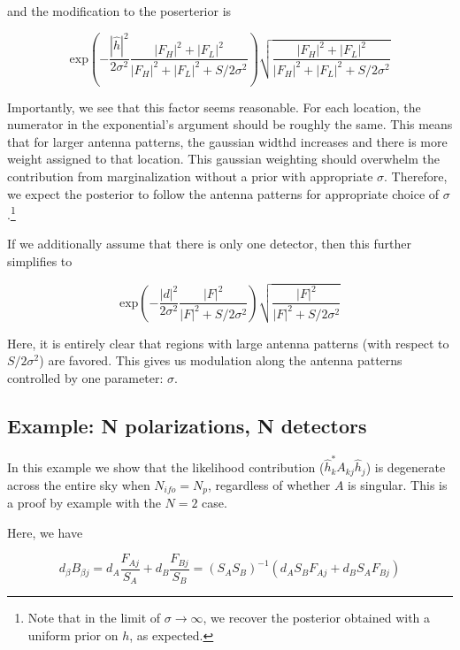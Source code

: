 \documentclass[10pt]{article}
\begin{document}
and the modification to the poserterior is

\begin{equation}
\mathrm{exp}\left( -\frac{|\hat{h}|^2}{2\sigma^2}\frac{|F_H|^2+|F_L|^2}{|F_H|^2+|F_L|^2+S/2\sigma^2}\right) \sqrt{\frac{|F_H|^2+|F_L|^2}{|F_H|^2+|F_L|^2 + S/2\sigma^2}}
\end{equation}

Importantly, we see that this factor seems reasonable. For each location, the numerator in the exponential's argument should be roughly the same. This means that for larger antenna patterns, the gaussian widthd increases and there is more weight assigned to that location. This gaussian weighting should overwhelm the contribution from marginalization without a prior with appropriate $\sigma$. Therefore, we expect the posterior to follow the antenna patterns for appropriate choice of $\sigma$.\footnote{Note that in the limit of $\sigma\rightarrow\infty$, we recover the posterior obtained with a uniform prior on $h$, as expected.}

If we additionally assume that there is only one detector, then this further simplifies to

\begin{equation}
\mathrm{exp}\left( -\frac{|d|^2}{2\sigma^2}\frac{|F|^2}{|F|^2+S/2\sigma^2}\right)\sqrt{\frac{|F|^2}{|F|^2+S/2\sigma^2}}
\end{equation}

Here, it is entirely clear that regions with large antenna patterns (with respect to $S/2\sigma^2$) are favored. This gives us modulation along the antenna patterns controlled by one parameter: $\sigma$.

\subsection{Example: N polarizations, N detectors}

In this example we show that the likelihood contribution ($\hat{h}_k^\ast A_{kj} \hat{h}_j$) is degenerate across the entire sky when $N_{ifo} = N_{p}$, regardless of whether $A$ is singular. This is a proof by example with the $N=2$ case.

Here, we have

\begin{equation}
d_\beta B_{\beta j} = d_A \frac{F_{Aj}}{S_A} + d_B \frac{F_{Bj}}{S_B} = (S_A S_B)^{-1} (d_A S_B F_{Aj} + d_B S_A F_{Bj})
\end{equation}
\end{document}
